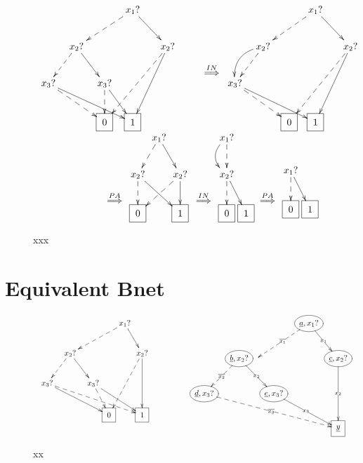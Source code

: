 \begin{figure}[h!]
$$
\begin{array}{c}
\xymatrix@C=.1pc{
&&&&&&x_1?\ar@{-->}[dllll]
\ar[drrr]
\\
&&x_2?\ar@{-->}[dll]\ar[drr]
&&&&&&&x_2?\ar@{-->}[ddlllll]\ar[ddlll]
\\
x_3?\ar[drrrrrr]\ar@{-->}[drrrr]
&&&&x_3?\ar@{-->}[d]\ar[drr]
\\
&&
&&\Rect{0}
&&\Rect{1}
&&
&&
&&
}
\xymatrix{\\\\
\stackrel{IN}{\implies}}
\xymatrix@C=.1pc{
&&&&&&x_1?\ar@{-->}[dllll]
\ar[drrr]
\\
&&x_2?\ar@{-->}[dll]\ar@/_1pc/[dll]
&&&&&&&x_2?\ar@{-->}[ddlllll]\ar[ddlll]
\\
x_3?\ar[drrrrrr]\ar@{-->}[drrrr]
&&&&
\\
&&
&&\Rect{0}
&&\Rect{1}
&&
&&
&&
}
\\
\xymatrix{\\\\\stackrel{PA}{\implies}}
\xymatrix@C=.1pc{
&x_1?\ar@{-->}[dl]\ar[dr]
\\
x_2?\ar@{-->}[d]\ar[drr]
&&x_2?\ar[d]\ar@{-->}[dll]
\\
\Rect{0}
&&\Rect{1}
}
\xymatrix{\\\\\stackrel{IN}{\implies}}
\xymatrix@C=.1pc{x_1?\ar@{-->}[d]\ar@/_1pc/[d]
\\
x_2?\ar@{-->}[d]\ar[dr]
\\
\Rect{0}
&\Rect{1}
}
\xymatrix{\\\\\stackrel{PA}{\implies}}
\xymatrix@C=.1pc{
\\
x_1?\ar@{-->}[d]\ar[dr]
\\
\Rect{0}
&\Rect{1}
}\end{array}
$$
\caption{xxx}
\label{fig-example-in}
\end{figure}





\section{Equivalent Bnet}

\begin{figure}[h!]
$$
\xymatrix@C=.1pc{
&&&&&&&x_1?\ar@{-->}[dllll]
\ar[dr]
\\
&&&x_2?\ar@{-->}[dll]\ar[drr]
&&&&&x_2?\ar@{-->}[ddll]\ar[dd]
\\
&x_3?\ar@{-->}[drrrrrrr]\ar[drrrrr]
&&&&x_3?\ar@{-->}[dr]\ar[drrr]
\\
&&
&&
&&\Rect{0}
&&\Rect{1}
&&
&&
&&
}
\xymatrix@C=.1pc{
&&&&&&&\Circle{\rva, x_1?}\ar@{-->}[dlll]|{\ol{x_1}}
\ar[dr]|{x_1}
\\
&&&\Circle{\rvb, x_2?}\ar@{-->}[dll]|{\ol{x_2}}\ar[drr]|{x_2}
&&&&&\Circle{\rvc, x_2?}\ar[dd]|{x_2}
\\
&\Circle{\rvd, x_3?}\ar@{-->}[drrrrrrr]|{\ol{x_3}}
&&&&\Circle{\rve, x_3?}\ar[drrr]|{x_3}
\\
&&
&&
&&
&&\Rect{\ul{y}}
&&
&&
&&
}
$$
\caption{xx}
\label{fig-bdd-to-bnet}
\end{figure}



